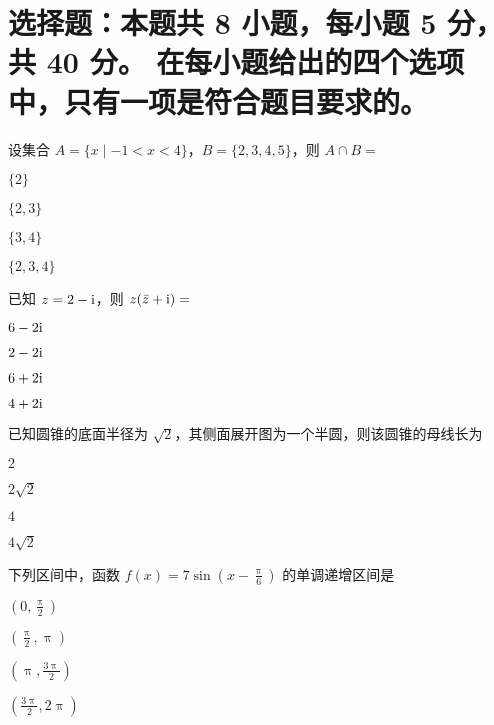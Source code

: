 \documentclass{exam-zh}
\begin{document}
\section{%
  选择题：本题共 8 小题，每小题 5 分，共 40 分。
  在每小题给出的四个选项中，只有一项是符合题目要求的。
}

\begin{question}[points = 2]
  设集合 $A = \{x \mid -1 < x < 4\}$，$B = \{2, 3, 4, 5\}$，则 $A \cap B = $ \paren[B]

  \begin{choices}
    \item $\{2\}$
    \item $\{2, 3\}$
    \item $\{3, 4\}$
    \item $\{2, 3, 4\}$
  \end{choices}
\end{question}

\begin{question}
  已知 $z = 2 - \mathrm{ i }$，则 $z (\bar{z} + \mathrm{ i }) = $ \paren
  \begin{choices}
    \item $6 - 2\mathrm{ i }$
    \item $2 - 2\mathrm{ i }$
    \item $6 + 2\mathrm{ i }$
    \item $4 + 2\mathrm{ i }$
  \end{choices}
\end{question}

\begin{question}
  已知圆锥的底面半径为 $\sqrt{2}$，其侧面展开图为一个半圆，则该圆锥的母线长为 \paren
  \begin{choices}
    \item $2$
    \item $2 \sqrt{2}$
    \item $4$
    \item $4 \sqrt{2}$
  \end{choices}
\end{question}

\begin{question}
  下列区间中，函数 $f(x) = 7 \sin \left( x - \frac{\uppi}{6} \right)$ 的单调递增区间是 \paren
  \begin{choices}
    \item $\left( 0               , \frac{\uppi}{2}  \right)$
    \item $\left( \frac{\uppi}{2} , \uppi            \right)$
    \item $\left( \uppi           , \frac{3\uppi}{2} \right)$
    \item $\left( \frac{3\uppi}{2}, 2\uppi           \right)$
  \end{choices}
\end{question}
\end{document}
